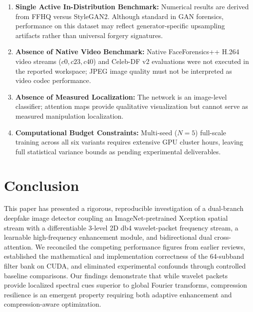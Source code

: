 \documentclass[11pt,a4paper]{article}
\begin{document}
\begin{enumerate}
    \item \textbf{Single Active In-Distribution Benchmark:} Numerical results are derived from FFHQ versus StyleGAN2. Although standard in GAN forensics, performance on this dataset may reflect generator-specific upsampling artifacts rather than universal forgery signatures.
    \item \textbf{Absence of Native Video Benchmark:} Native FaceForensics++ H.264 video streams ($c0, c23, c40$) and Celeb-DF v2 evaluations were not executed in the reported workspace; JPEG image quality must not be interpreted as video codec performance.
    \item \textbf{Absence of Measured Localization:} The network is an image-level classifier; attention maps provide qualitative visualization but cannot serve as measured manipulation localization.
    \item \textbf{Computational Budget Constraints:} Multi-seed ($N=5$) full-scale training across all six variants requires extensive GPU cluster hours, leaving full statistical variance bounds as pending experimental deliverables.
\end{enumerate}

\section{Conclusion}
\label{sec:conclusion}

This paper has presented a rigorous, reproducible investigation of a dual-branch deepfake image detector coupling an ImageNet-pretrained Xception spatial stream with a differentiable 3-level 2D db4 wavelet-packet frequency stream, a learnable high-frequency enhancement module, and bidirectional dual cross-attention. We reconciled the competing performance figures from earlier reviews, established the mathematical and implementation correctness of the 64-subband filter bank on CUDA, and eliminated experimental confounds through controlled baseline comparisons. Our findings demonstrate that while wavelet packets provide localized spectral cues superior to global Fourier transforms, compression resilience is an emergent property requiring both adaptive enhancement and compression-aware optimization.

\end{document}
